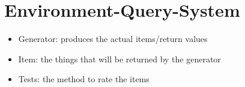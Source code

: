 \chapter{Environment-Query-System}
    \begin{itemize}
        \item Generator: produces the actual items/return values
        \item Item: the things that will be returned by the generator
        \item Tests: the method to rate the items
    \end{itemize}